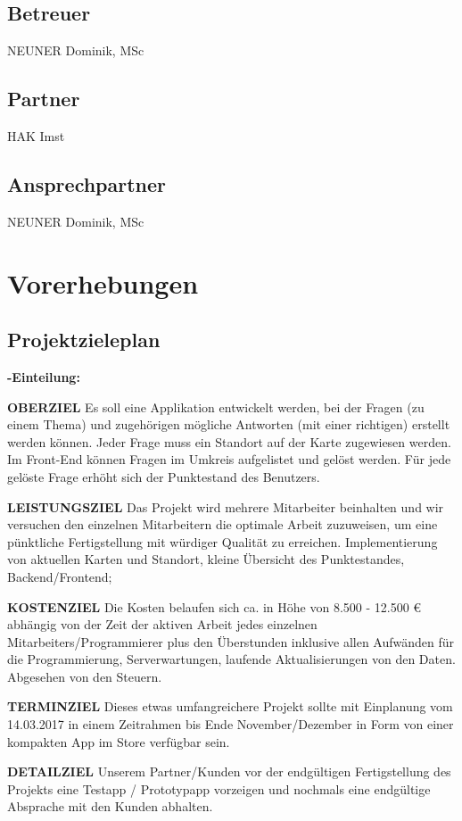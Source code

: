 \subsection{Betreuer}
NEUNER Dominik, MSc
\subsection{Partner}
HAK Imst
\subsection{Ansprechpartner}
NEUNER Dominik, MSc
\section{Vorerhebungen}
\subsection{Projektzieleplan}

\textbf {-Einteilung:}


\textbf {OBERZIEL} Es soll eine Applikation entwickelt werden, bei der Fragen (zu einem Thema) und zugehörigen mögliche Antworten (mit einer richtigen) erstellt werden können. Jeder Frage muss ein Standort auf der Karte zugewiesen werden.
Im Front-End können Fragen im Umkreis aufgelistet und gelöst werden. Für jede gelöste Frage erhöht sich der Punktestand des Benutzers.  


\textbf {LEISTUNGSZIEL} Das Projekt wird mehrere Mitarbeiter beinhalten und wir versuchen den einzelnen Mitarbeitern die optimale Arbeit zuzuweisen, um eine pünktliche Fertigstellung mit würdiger Qualität zu erreichen. Implementierung von aktuellen Karten und Standort, kleine Übersicht des Punktestandes, Backend/Frontend;


\textbf {KOSTENZIEL} Die Kosten belaufen sich ca. in Höhe von 8.500 - 12.500 € abhängig von der Zeit der aktiven Arbeit jedes einzelnen Mitarbeiters/Programmierer plus den Überstunden inklusive allen Aufwänden für die Programmierung, Serverwartungen, laufende Aktualisierungen von den Daten. Abgesehen von den Steuern.


\textbf {TERMINZIEL} Dieses etwas umfangreichere Projekt sollte mit Einplanung vom 14.03.2017 in einem Zeitrahmen bis Ende November/Dezember in Form von einer kompakten App im Store verfügbar sein.


\textbf {DETAILZIEL} Unserem Partner/Kunden vor der endgültigen Fertigstellung des Projekts eine Testapp /  Prototypapp vorzeigen und nochmals eine endgültige Absprache mit den Kunden abhalten.



